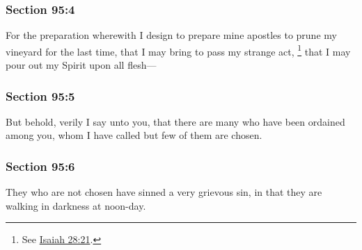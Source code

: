 	\subsubsection{Section 95:4} %
		\label{DC95-4}

		For the preparation wherewith I design to prepare mine apostles to prune my vineyard for the last time, that I may bring to pass my strange act,%
			\footnote{%
				See \hyperref[ISAIAH-28-21]{Isaiah 28:21}.
				}
		that I may pour out my Spirit upon all flesh---


	\subsubsection{Section 95:5} %
		\label{DC95-5}

		But behold, verily I say unto you, that there are many who have been ordained among you, whom I have called but few of them are chosen.


	\subsubsection{Section 95:6} %
		\label{DC95-6}

		They who are not chosen have sinned a very grievous sin, in that they are walking in darkness at noon-day.


